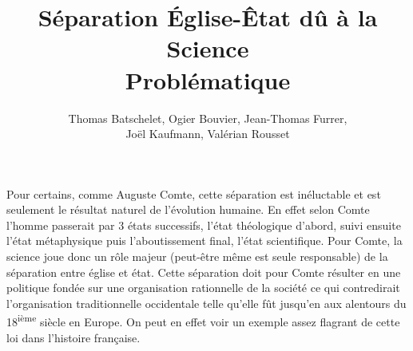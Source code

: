 \documentclass{article}
\title{Séparation Église-Êtat dû à la Science \\
	\large{Problématique}}
\author{Thomas Batschelet, Ogier Bouvier, Jean-Thomas Furrer, \\ Joël Kaufmann, Valérian Rousset}
\begin{document}
\maketitle

Pour certains, comme Auguste Comte, cette séparation est inéluctable
et est seulement le résultat naturel de l'évolution humaine. En effet
selon Comte l'homme passerait par 3 états successifs, l'état
théologique d'abord, suivi ensuite l'état métaphysique puis
l'aboutissement final, l'état scientifique. Pour Comte, la science
joue donc un rôle majeur (peut-être même est seule responsable) de la
séparation entre église et état. Cette séparation doit pour Comte
résulter en une politique fondée sur une organisation rationnelle de
la société ce qui contredirait l'organisation traditionnelle
occidentale telle qu'elle fût jusqu'en aux alentours du
18\textsuperscript{ième} siècle en Europe. On peut en effet voir un
exemple assez flagrant de cette loi dans l'histoire française.
\end{document}
